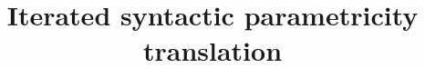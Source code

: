 \documentclass{article}
\newcommand{\sort}[1]{\mathsf{U}_{#1}}
\newcommand{\deprewlr}[1]{\raisebox{0em}{$\ulcorner$}\!#1}
\newcommand{\deprewrl}[1]{{#1}\raisebox{-0.2em}{$\!\lrcorner$}}
\begin{document}
\title{Iterated syntactic parametricity translation}

\maketitle

\newcommand{\emptysigma}{\bullet}
\newcommand{\itsemterm}[4]{\llbracket #4 \rrbracket^{#2;#3}_{#1}}
\newcommand{\itsemtype}[4]{\llbracket #4 \rrbracket^{#2;#3}_{#1}}
\newcommand{\semterm}[3]{\llbracket #3 \rrbracket^{#1;#2}}
\newcommand{\semtype}[3]{\llbracket #3 \rrbracket^{#1;#2}}
\newcommand{\incrstep}[3]{\mathsf{split}_{#1}{#3}(#2)}
\newcommand{\distrstep}[3]{\mathsf{distr}_{#1}{#3}(#2)}
\newcommand{\applytype}[4]{\mathsf{apptype}_{#1}^{#2}(#3,#4)}
\newcommand{\shrink}[3]{\mathsf{shrink}_{#1}\,{#2}\,#3}
\newcommand{\under}[3]{\mathsf{under}_{#1}\,{#2}\,#3}
\newcommand{\undertau}[3]{\mathsf{under}_{#1}^{#2}\,#3}
\newcommand{\proj}[3]{\pi_{#1}^{#2}\,#3}
\newcommand{\elt}[2]{\mathsf{El}_{#1}\,#2}
\newcommand{\semtypenew}[2]{| #2 |_{#1}}
\newcommand{\semnew}[2]{\llbracket #2 \rrbracket_{#1}}
\newcommand{\semctx}[2]{\llbracket #2 \rrbracket_{#1}}
\newcommand{\semlam}[5]{\mathsf{lam}_{#1}^{#2}\,#4\,(#3)\,#5}
\newcommand{\semlambis}[5]{\mathsf{lam'}_{#1}^{#2}\,#4\,(#3)\,#5}
\newcommand{\semapp}[3]{\mathsf{app}_{#1}#2\,#3}
\newcommand{\semprod}[5]{\mathsf{prod}_{#1}^{#2}\,#4\,(#3)\,#5}
\newcommand{\access}[2]{\mathsf{get}_{#1}(#2)}
\newcommand{\accesstyped}[3]{\mathsf{get}_{#1}^{#2}(#3)}
\newcommand{\lift}[1]{\mathsf{lift}\, {#1}}
\newcommand{\liftlr}[1]{\mathsf{lift}^\rightarrow\, {#1}}
\newcommand{\liftrl}[1]{\mathsf{lift}^\leftarrow\, {#1}}
\newcommand{\diag}[2]{\mathsf{diag}_{#1}(#2)}
\newcommand{\semsort}[1]{\mathsf{sort}_{#1}}
\newcommand{\reflsort}[1]{\mathsf{refl}^{\sort{}}_{#1}}
\newcommand{\mktuplenew}[6]{\{#4\,|\begin{array}{l} #5 \\ #6 \end{array}\}_{#1,#2,#3}}
\newcommand{\mktuplein}[4]{{#1}; {#2}; {#3}; {#4}}
\newcommand{\nwconn}[2]{\deprewlr{#2}_{#1}}
\newcommand{\seconn}[2]{\deprewrl{#2}_{#1}}
\newcommand{\refltermn}[3]{\mathsf{reflterm}_{#1}(#3)}
\newcommand{\refltypen}[2]{\mathsf{refltype}_{#1}(#2)}
\end{document}

